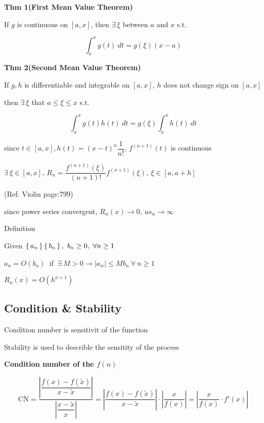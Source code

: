 \textbf{Thm 1(First Mean Value Theorem)}

\begin{tcolorbox}
	If $g$ is continuous on $[a,x]$, then $\exists~\xi$ between $a$ and $x$ s.t. 

	$$ \int^x_ag(t)~dt = g(\xi)(x-a)$$
\end{tcolorbox}



\textbf{Thm 2(Second Mean Value Theorem)}

\begin{tcolorbox}
	If $g,h$ is differentiable and integrable on $[a,x]$, $h$ does not change sign on $[a,x]$

	then $\exists~\xi$ that $a\leq\xi\leq x$ s.t.

$$ \int^x_ag(t)h(t)~dt = g(\xi)\int^x_ah(t)~dt$$
\end{tcolorbox}

since $t \in [a,x], h(t)=(x-t)^n\dfrac{1}{n!}$, $f^{(n+1)}(t)$ is continuous

$\exists ~\xi \in [a,x]$, $R_n = \dfrac{f^{(n+1)}(\xi)}{(n+1)!}f^{(x+1)}(\xi), ~\xi \in [a,a+h]$

(Ref. Violin page:799)

since power series convergent, $R_n(x) \rightarrow 0,~as_n \rightarrow \infty$

\newpage

Definition

\begin{tcolorbox}
	Given $\left\{ \,a_n \,\right\}\left\{ \,b_n \,\right\},~ b_n \geq 0, ~\forall n \geq 1$
	
	$a_n = O(b_n)~$ if $~\exists ~M > 0 \rightarrow |a_w| \leq Mb_n~\forall ~n\geq 1$
	
	$R_n(x)=O(h^{n+1})$
\end{tcolorbox}

\subsection{Condition \& Stability} $ $\\

Condition number is sensitivit of the function

Stability is used to describle the sensitity of the process

\textbf{Condition number of the $f(n)$}

$$\text{CN} = \dfrac{|\dfrac{f(x)-f(\tilde{x})}{x-\tilde{x}} |}{|\dfrac{x-\tilde{x}}{x} |} = |\dfrac{f(x)-f(\tilde{x})}{x-\tilde{x}}|\cdot|\dfrac{x}{f(x)}| = |\dfrac{x}{f(x)} \cdot f'(x) |$$

